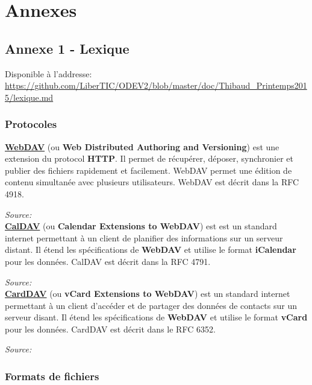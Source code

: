 \section*{Annexes}

\subsection*{Annexe 1 - Lexique}


Disponible à l'addresse: \url{https://github.com/LiberTIC/ODEV2/blob/master/doc/Thibaud_Printemps2015/lexique.md}


\subsubsection*{Protocoles}

\underline{\textbf{WebDAV}} (ou \textbf{Web Distributed Authoring and Versioning}) est une extension du protocol \textbf{HTTP}. Il permet de récupérer, déposer, synchronier et publier des fichiers rapidement et facilement. WebDAV permet une édition de contenu simultanée avec plusieurs utilisateurs. WebDAV est décrit dans la RFC 4918.

\textit{Source: }\\

\underline{\textbf{CalDAV}} (ou \textbf{Calendar Extensions to WebDAV}) est est un standard internet permettant à un client de planifier des informations sur un serveur distant. Il étend les spécifications de \textbf{WebDAV} et utilise le format \textbf{iCalendar} pour les données. CalDAV est décrit dans la RFC 4791.

\textit{Source: }\\

\underline{\textbf{CardDAV}} (ou \textbf{vCard Extensions to WebDAV}) est un standard internet permettant à un client d'accéder et de partager des données de contacts sur un serveur disant. Il étend les spécifications de \textbf{WebDAV} et utilise le format \textbf{vCard} pour les données. CardDAV est décrit dans le RFC 6352.

\textit{Source: }\\


\subsubsection*{Formats de fichiers}


